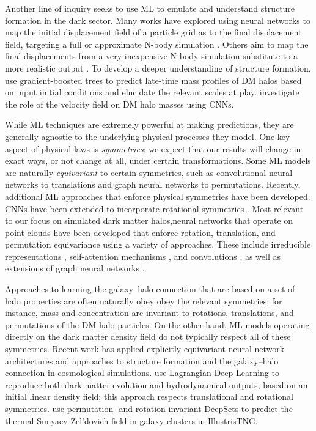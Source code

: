 Another line of inquiry seeks to use ML to emulate and understand structure formation in the dark sector.
Many works have explored using neural networks to map the initial displacement field of a particle grid as to the final displacement field, targeting a full or approximate N-body simulation \citep{he_learning_2018,jamieson_field_2022}.
Others aim to map the final displacements from a very inexpensive N-body simulation substitute to a more realistic output \citep{piras_fast_2023}. 
To develop a deeper understanding of structure formation, \cite{lucie-smith_insights_2022} use gradient-boosted trees to predict late-time mass profiles of DM halos based on input initial conditions and elucidate the relevant scales at play.
\cite{etezad-razavi_unravelling_2023} investigate the role of the velocity field on DM halo masses using CNNs.

While ML techniques are extremely powerful at making predictions, they are generally agnostic to the underlying physical processes they model.
One key aspect of physical laws is \emph{symmetries}: we expect that our results will change in exact ways, or not change at all, under certain transformations.
Some ML models are naturally \emph{equivariant} to certain symmetries, such as convolutional neural networks to translations and graph neural networks to permutations.
Recently, additional ML approaches that enforce physical symmetries have been developed.
CNNs have been extended to incorporate rotational symmetries \citep{cohen2019gauge,wang2021incorporating,ocampo_scalable_2023}.
Most relevant to our focus on simulated dark matter halos,neural networks that operate on point clouds have been developed that enforce rotation, translation, and permutation equivariance using a variety of approaches.
These include irreducible representations \citep{thomas2018tensor}, self-attention mechanisms \citep{fuchs2020se}, and convolutions \citep{kondor2018covariant,zhang2019rotation}, as well as extensions of graph neural networks \cite{Satorras2021}.

Approaches to learning the galaxy--halo connection that are based on a set of halo properties are often naturally obey obey the relevant symmetries; for instance, mass and concentration are invariant to rotations, translations, and permutations of the DM halo particles.
On the other hand, ML models operating directly on the dark matter density field do not typically respect all of these symmetries.
Recent work has applied explicitly equivariant neural network architectures and approaches to structure formation and the galaxy--halo connection in cosmological simulations.
\cite{dai_learning_2020} use Lagrangian Deep Learning to reproduce both dark matter evolution and hydrodynamical outputs, based on an initial linear density field; this approach respects translational and rotational symmetries.
\cite{thiele_predicting_2022} use permutation- and rotation-invariant DeepSets to predict the thermal Sunyaev-Zel'dovich field in galaxy clusters in IllustrisTNG.

